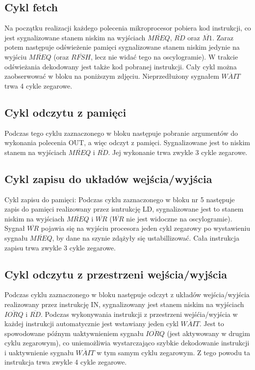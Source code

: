 \documentclass[fleqn]{article}
\newcommand\square[1]{
	\fcolorbox{black}{#1}{\rule{0pt}{6pt}\rule{6pt}{0pt}}
}
\begin{document}


\subsection{Cykl fetch}

Na początku realizacji każdego polecenia mikroprocesor pobiera kod instrukcji, co jest sygnalizowane stanem niskim na wyjściach $\overline{MREQ}$, $\overline{RD}$ oraz $\overline{M1}$. Zaraz potem następuje odświeżenie pamięci sygnalizowane stanem niskim jedynie na wyjściu $\overline{MREQ}$ (oraz $\overline{RFSH}$, lecz nie widać tego na oscylogramie). W trakcie odświeżania dekodowany jest także kod pobranej instrukcji.
Cały cykl można zaobserwować w bloku \square{red} na poniższym zdjęciu. Nieprzedłużony sygnałem $\overline{WAIT}$ trwa 4 cykle zegarowe.

\subsection{Cykl odczytu z pamięci}

Podczas tego cyklu zaznaczonego w bloku \square{cyan} następuje pobranie argumentów do wykonania polecenia OUT, a więc odczyt z pamięci.
Sygnalizowane jest to niskim stanem na wyjściach $\overline{MREQ}$ i $\overline{RD}$. Jej wykonanie trwa zwykle 3 cykle zegarowe.

\subsection{Cykl zapisu do układów wejścia/wyjścia}

Cykl zapisu do pamięci:
Podczas cyklu zaznaczonego w bloku nr 5 następuje zapis do pamięci realizowany przez isntrukcję LD, sygnalizowane jest to stanem niskim na wyjściach $\overline{MREQ}$ i $\overline{WR}$ ($\overline{WR}$ nie jest widoczne na oscylogramie). Sygnał $\overline{WR}$ pojawia się na wyjściu procesora jeden cykl zegarowy po wystawieniu sygnału $\overline{MREQ}$, by dane na szynie zdążyły się ustabillizować. Cała instrukcja zapisu trwa zwykle 3 cykle zegarowe.



\subsection{Cykl odczytu z przestrzeni wejścia/wyjścia}

Podczas cyklu zaznaczonego w bloku \square{violet} następuje odczyt z układów wejścia/wyjścia realizowany przez instrukcję IN, sygnalizowany jest stanem niskim na wyjściach $\overline{IORQ}$ i $\overline{RD}$. Podczas wykonywania instrukcji z przestrzeni wejśćia/wyjścia w każdej instrukcji automatycznie jest wstawiany jeden cykl $\overline{WAIT}$. Jest to spowodowane późnym uaktywnieniem sygnału $\overline{IORQ}$ (jest aktywowany w drugim cyklu zegarowym), co uniemożliwia wystarczająco szybkie dekodowanie instrukcji i uaktywnienie sygnału $\overline{WAIT}$ w tym samym cyklu zegarowym. Z tego powodu ta instrukcja trwa zwykle 4 cykle zegarowe.
\end{document}
